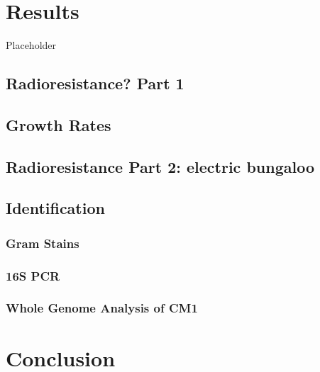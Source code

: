 \documentclass[12pt,twoside]{reedthesis}
\begin{document}
\hypertarget{results}{%
\chapter{Results}\label{results}}

Placeholder

\hypertarget{radioresistance-part-1}{%
\section{Radioresistance? Part 1}\label{radioresistance-part-1}}

\hypertarget{growth-rates}{%
\section{Growth Rates}\label{growth-rates}}

\hypertarget{radioresistance-part-2-electric-bungaloo}{%
\section{Radioresistance Part 2: electric bungaloo}\label{radioresistance-part-2-electric-bungaloo}}

\hypertarget{identification}{%
\section{Identification}\label{identification}}

\hypertarget{gram-stains}{%
\subsection{Gram Stains}\label{gram-stains}}

\hypertarget{s-pcr}{%
\subsection{16S PCR}\label{s-pcr}}

\hypertarget{whole-genome-analysis-of-cm1}{%
\subsection{Whole Genome Analysis of CM1}\label{whole-genome-analysis-of-cm1}}

\hypertarget{conclusion}{%
\chapter{Conclusion}\label{conclusion}}
\end{document}
